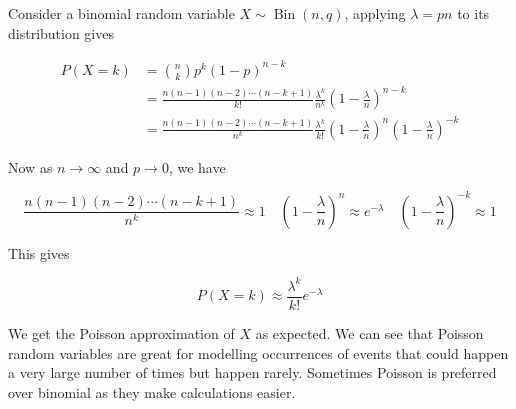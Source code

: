\documentclass[12pt, a4paper]{article}
\newcommand{\Bin}{\operatorname{Bin}}
\begin{document}
Consider a binomial random variable $X\sim\Bin(n,q)$, applying $\lambda=pn$ to its distribution gives

\begin{align}
P(X = k) &= {n \choose k}p^k(1-p)^{n-k} \\
&=\frac{n(n-1)(n-2)\cdots(n-k+1)}{k!}\frac{\lambda^k}{n^k}\left(1-\frac{\lambda}{n}\right)^{n-k} \\
&=\frac{n(n-1)(n-2)\cdots(n-k+1)}{n^k}\frac{\lambda^k}{k!}\left(1-\frac{\lambda}{n}\right)^n\left(1-\frac{\lambda}{n}\right)^{-k}
\end{align}

Now as $n \to \infty$ and $p \to 0$, we have

$$\frac{n(n-1)(n-2)\cdots(n-k+1)}{n^k} \approx 1 \quad \left(1-\frac{\lambda}{n}\right)^n \approx e^{-\lambda} \quad \left(1-\frac{\lambda}{n}\right)^{-k} \approx 1$$

This gives

$$P(X = k) \approx \frac{\lambda^k}{k!}e^{-\lambda}$$

We get the Poisson approximation of $X$ as expected. We can see that Poisson random variables are great for modelling occurrences of events that could happen a very large number of times but happen rarely. Sometimes Poisson is preferred over binomial as they make calculations easier.
\end{document}
